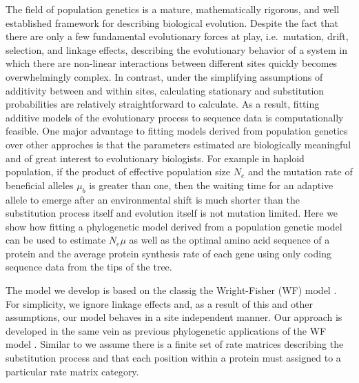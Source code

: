 \documentclass{article}
\newcommand{\Ne}{\ensuremath{{N_e}}\xspace} %
\newcommand{\Nemu}{\ensuremath{{N_e \mu}}\xspace} %
\begin{document}
The field of population genetics is a mature, mathematically rigorous, and well established framework for describing biological evolution.
Despite the fact that there are only a few fundamental evolutionary forces at play, i.e.~mutation, drift, selection, and linkage effects, describing the evolutionary behavior of a system in which there are non-linear interactions between different sites quickly becomes overwhelmingly complex.
In contrast, under the simplifying assumptions of additivity between and within sites, calculating stationary and substitution probabilities are relatively straightforward to calculate.
As a result, fitting additive models of the evolutionary process to sequence data is computationally feasible.
One major advantage to fitting models derived from population genetics over other approches is that the parameters estimated are biologically meaningful and of great interest to evolutionary biologists.
For example in haploid population, if the product of effective population size $\Ne$ and the mutation rate of beneficial alleles $\mu_b$ is greater than one, then the waiting time for an adaptive allele to emerge after an environmental shift is much shorter than the substitution process itself and evolution itself is not mutation limited.
Here we show how fitting a phylogenetic model derived from a population genetic model can be used to estimate $\Nemu$ as well as the optimal amino acid sequence of a protein and the average protein synthesis rate of each gene using only coding sequence data from the tips of the tree.

The model we develop is based on the classig the Wright-Fisher (WF) model \citep{Kimura1962,Wright1969,Iwasa1988,BergAndLassig2003,SellaAndHirsh2005}.
For simplicity, we ignore linkage effects and, as a result of this and other assumptions, our model behaves in a site independent manner.
Our approach is developed in the same vein as previous phylogenetic applications of the WF model \citep[e.g.][]{MuseAndGaut1994,HalpernAndBruno1998,YangAndNielsen2008,RodrigueEtAl2005,KoshiAndGoldstein1997,KoshiEtAl1999,DimmicEtAl2000,ThorneEtAl2012,LartillotAndPhilippe2004,RodrigueAndLartillot2014}. %
Similar to \citet{LartillotAndPhilippe2004,RodrigueAndLartillot2014} we assume there is a finite set of rate matrices describing the substitution process and that each position within a protein must assigned to a particular rate matrix category.%
\end{document}
